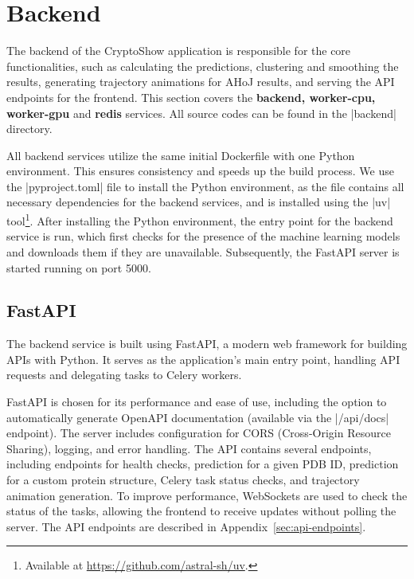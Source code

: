 \section{Backend}
\label{sec:backend}

The backend of the CryptoShow application is responsible for the core functionalities, such as calculating the predictions, clustering and smoothing the results, generating trajectory animations for AHoJ results, and serving the API endpoints for the frontend. This section covers the \textbf{backend, worker-cpu, worker-gpu} and \textbf{redis} services. All source codes can be found in the \inline|backend| directory.

All backend services utilize the same initial Dockerfile with one Python environment. This ensures consistency and speeds up the build process. We use the \inline|pyproject.toml| file to install the Python environment, as the file contains all necessary dependencies for the backend services, and is installed using the \inline|uv| tool\footnote{Available at \url{https://github.com/astral-sh/uv}.}. After installing the Python environment, the entry point for the backend service is run, which first checks for the presence of the machine learning models and downloads them if they are unavailable. Subsequently, the FastAPI server is started running on port 5000.

\subsection{FastAPI}
\label{sec:fastapi}

The backend service is built using FastAPI, a modern web framework for building APIs with Python. It serves as the application's main entry point, handling API requests and delegating tasks to Celery workers.

FastAPI is chosen for its performance and ease of use, including the option to automatically generate OpenAPI documentation (available via the \inline|/api/docs| endpoint). The server includes configuration for CORS (Cross-Origin Resource Sharing), logging, and error handling. The API contains several endpoints, including endpoints for health checks, prediction for a given PDB ID, prediction for a custom protein structure, Celery task status checks, and trajectory animation generation. To improve performance, WebSockets are used to check the status of the tasks, allowing the frontend to receive updates without polling the server. The API endpoints are described in Appendix~\ref{sec:api-endpoints}.

